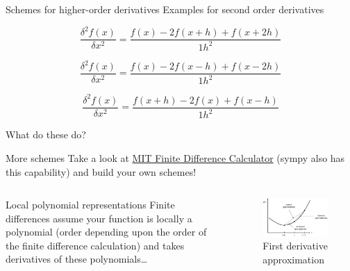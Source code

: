 \documentclass[presentation]{beamer}
\begin{document}
\begin{frame}[label={sec:org28fa0a0}]{Schemes for higher-order derivatives}
Examples for second order derivatives
\begin{example}
\[ \frac{\delta^2 f(x)}{\delta x^2} = \frac{f(x)-2f(x+h)+f(x+2h)}{1h^{2}} \]
\end{example}
\begin{example}
\[ \frac{\delta^2 f(x)}{\delta x^2} = \frac{f(x)-2f(x-h)+f(x-2h)}{1h^{2}} \]
\end{example}
\begin{example}
\[ \frac{\delta^2 f(x)}{\delta x^2} = \frac{f(x+h)-2f(x)+f(x-h)}{1h^{2}} \]
\end{example}
\end{frame}
\begin{frame}[label={sec:org05fd137}]{What do these do?}
\begin{block}{More schemes}
Take a look at \href{http://web.media.mit.edu/\~crtaylor/calculator.html}{MIT Finite Difference Calculator} (sympy also has this
capability) and build your own schemes!
\end{block}
\begin{columns}
\begin{column}{0.6\columnwidth}
\begin{block}{Local polynomial representations}
Finite differences assume your function is locally a polynomial (order
depending upon the order of the finite difference calculation) and takes
derivatives of these polynomials\ldots{}
\end{block}
\end{column}
\begin{column}{0.5\columnwidth}
\begin{figure}[htbp]
\centering
\includegraphics[width=1.0\textwidth]{images/fdiff.jpg}
\caption{First derivative approximation}
\end{figure}
\end{column}
\end{columns}
\end{frame}
\end{document}
